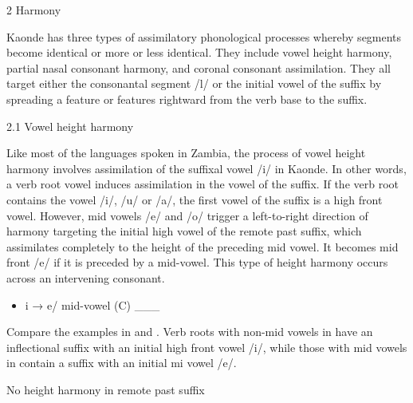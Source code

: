 \documentclass[output=paper]{langsci/langscibook}
\begin{document}
\begin{stylelsSectioni}
2 Harmony 
\end{stylelsSectioni}

Kaonde has three types of assimilatory phonological processes whereby segments become identical or more or less identical. They include vowel height harmony, partial nasal consonant harmony, and coronal consonant assimilation. They all target either the consonantal segment /l/ or the initial vowel of the suffix by spreading a feature or features rightward from the verb base to the suffix.

\begin{stylelsSectionii}
2.1 Vowel height harmony
\end{stylelsSectionii}

Like most of the languages spoken in Zambia, the process of vowel height harmony involves assimilation of the suffixal vowel /i/ in Kaonde. In other words, a verb root vowel induces assimilation in the vowel of the suffix. If the verb root contains the vowel /i/, /u/ or /a/, the first vowel of the suffix is a high front vowel. However, mid vowels /e/ and /o/ trigger a left-to-right direction of harmony targeting the initial high vowel of the remote past suffix, which assimilates completely to the height of the preceding mid vowel. It becomes mid front /e/ if it is preceded by a mid-vowel. This type of height harmony occurs across an intervening consonant.

\begin{itemize}
\item \begin{stylelsLanginfo}
i → e/ mid-vowel (C) \_\_\_
\end{stylelsLanginfo}\end{itemize}

Compare the examples in  and . Verb roots with non-mid vowels in  have an inflectional suffix with an initial high front vowel /i/, while those with mid vowels in  contain a suffix with an initial mi vowel /e/. 

\begin{stylelsTableHeading}%
\begin{table}
\caption{No height harmony in remote past suffix}
\label{tab:2}
\end{table}\end{stylelsTableHeading}
\end{document}
